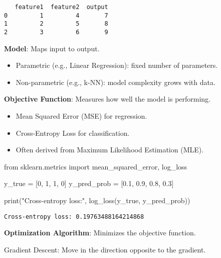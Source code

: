 \documentclass[
  letterpaper,
  DIV=11,
  numbers=noendperiod]{scrreprt}
\newenvironment{Shaded}{\begin{snugshade}}{\end{snugshade}}
\newcommand{\BuiltInTok}[1]{\textcolor[rgb]{0.00,0.23,0.31}{#1}}
\newcommand{\DecValTok}[1]{\textcolor[rgb]{0.68,0.00,0.00}{#1}}
\newcommand{\FloatTok}[1]{\textcolor[rgb]{0.68,0.00,0.00}{#1}}
\newcommand{\ImportTok}[1]{\textcolor[rgb]{0.00,0.46,0.62}{#1}}
\newcommand{\NormalTok}[1]{\textcolor[rgb]{0.00,0.23,0.31}{#1}}
\newcommand{\OperatorTok}[1]{\textcolor[rgb]{0.37,0.37,0.37}{#1}}
\newcommand{\StringTok}[1]{\textcolor[rgb]{0.13,0.47,0.30}{#1}}
\providecommand{\tightlist}{%
  \setlength{\itemsep}{0pt}\setlength{\parskip}{0pt}}\usepackage{longtable,booktabs,array}
\begin{document}
\begin{verbatim}
   feature1  feature2  output
0         1         4       7
1         2         5       8
2         3         6       9
\end{verbatim}

\textbf{Model}: Maps input to output.

\begin{itemize}
\tightlist
\item
  Parametric (e.g., Linear Regression): fixed number of parameters.
\item
  Non-parametric (e.g., k-NN): model complexity grows with data.
\end{itemize}

\textbf{Objective Function}: Measures how well the model is performing.

\begin{itemize}
\tightlist
\item
  Mean Squared Error (MSE) for regression.
\item
  Cross-Entropy Loss for classification.
\item
  Often derived from Maximum Likelihood Estimation (MLE).
\end{itemize}

\begin{Shaded}
\begin{Highlighting}[]
\ImportTok{from}\NormalTok{ sklearn.metrics }\ImportTok{import}\NormalTok{ mean\_squared\_error, log\_loss}

\NormalTok{y\_true }\OperatorTok{=}\NormalTok{ [}\DecValTok{0}\NormalTok{, }\DecValTok{1}\NormalTok{, }\DecValTok{1}\NormalTok{, }\DecValTok{0}\NormalTok{]}
\NormalTok{y\_pred\_prob }\OperatorTok{=}\NormalTok{ [}\FloatTok{0.1}\NormalTok{, }\FloatTok{0.9}\NormalTok{, }\FloatTok{0.8}\NormalTok{, }\FloatTok{0.3}\NormalTok{]}

\BuiltInTok{print}\NormalTok{(}\StringTok{"Cross{-}entropy loss:"}\NormalTok{, log\_loss(y\_true, y\_pred\_prob))}
\end{Highlighting}
\end{Shaded}

\begin{verbatim}
Cross-entropy loss: 0.19763488164214868
\end{verbatim}

\textbf{Optimization Algorithm}: Minimizes the objective function.

Gradient Descent: Move in the direction opposite to the gradient.
\end{document}
